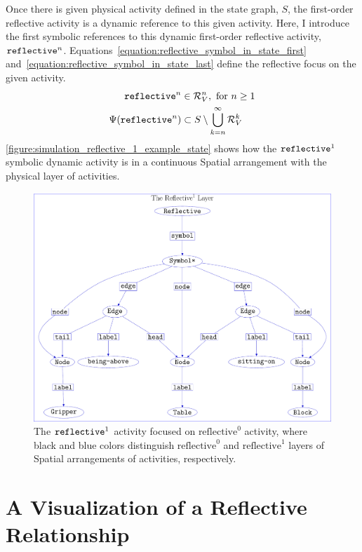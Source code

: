 Once there is given physical activity defined in the state graph, $S$,
the first-order reflective activity is a dynamic reference to this
given activity.  Here, I introduce the first symbolic references to
this dynamic first-order reflective activity,
$\text{\tt{reflective}}^n$.
{\mbox{Equations~\ref{equation:reflective_symbol_in_state_first}}}
{\mbox{and~\ref{equation:reflective_symbol_in_state_last}}} define the
reflective focus on the given activity.
\begin{align}
\label{equation:reflective_symbol_in_state_first}
        \text{\tt{reflective}}^n &\in \mathcal{R}^n_V, \text{~for $n \geq 1$} \\
\label{equation:reflective_symbol_in_state_last}
  \Psi(\text{\tt{reflective}}^n) &\subset S \setminus \bigcup_{k=n}^\infty\mathcal{R}^k_V
\end{align}
{\mbox{\autoref{figure:simulation_reflective_1_example_state}}} shows
how the $\text{\tt reflective}^1$ symbolic dynamic activity is in a
continuous Spatial arrangement with the physical layer of activities.
\begin{figure}
\center
\includegraphics[width=12cm]{gfx/simulation_reflective_1_example_state}
\caption[The $\text{\tt reflective}^1$ activity focused on physical
  activity.]{The $\text{\tt reflective}^1$ activity focused on
  $\text{reflective}^0$ activity, where black and blue colors
  distinguish $\text{reflective}^0$ and $\text{reflective}^1$ layers
  of Spatial arrangements of activities, respectively.}
\label{figure:simulation_reflective_1_example_state}
\end{figure}

\section{A Visualization of a Reflective Relationship}


